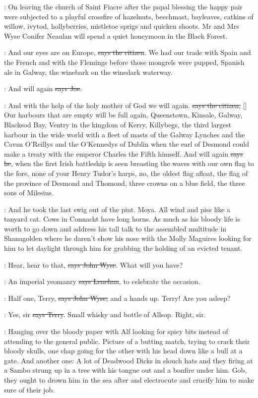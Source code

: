 :
On leaving the church of Saint Fiacre  after the papal
blessing the happy pair were subjected to a playful crossfire
of hazelnuts, beechmast, bayleaves, catkins of willow, ivytod,
hollyberries, mistletoe sprigs and quicken shoots. Mr and Mrs Wyse
Conifer Neaulan will spend a quiet honeymoon in the Black Forest.

\citizen:
And our eyes are on Europe, \sout{says the citizen}.
We had our trade with
Spain and the French and with the Flemings before those mongrels were
pupped, Spanish ale in Galway, the winebark on the winedark waterway.

\joe:
And will again \sout{says Joe}.

\citizen:
And with the help of the holy mother of God
we will again. \sout{says the
citizen,} []
Our harbours that are empty will be full
again, Queenstown, Kinsale, Galway, Blacksod Bay, Ventry in the kingdom of
Kerry, Killybegs, the third largest harbour in the wide world with a fleet
of masts of the Galway Lynches and the Cavan O'Reillys and the
O'Kennedys of Dublin when the earl of Desmond could make a treaty with
the emperor Charles the Fifth himself. And will again \sout{says he}, when the
first Irish battleship is seen breasting the waves with our own flag to
the fore, none of your Henry Tudor's harps, no, the oldest flag afloat,
the flag of the province of Desmond and Thomond, three crowns on a blue
field, the three sons of Milesius.

\Nq:
And he took the last swig out of the pint. Moya. All wind and piss like
a tanyard cat. Cows in Connacht have long horns. As much as his bloody
life is worth to go down and address his tall talk to the assembled
multitude in Shanagolden where he daren't show his nose with the Molly
Maguires looking for him to let daylight through him for grabbing the
holding of an evicted tenant.

\johnwyse:
Hear, hear to that, \sout{says John Wyse}.
What will you have?

\lenehan:
An imperial yeomanry \sout{says Lenehan},
to celebrate the occasion.

\johnwyse:
Half one, Terry, \sout{says John Wyse,}
and a hands up. Terry! Are you asleep?

\terry:
Yes, sir \sout{says Terry}.
Small whisky and bottle of Allsop. Right, sir.

\Nq:
Hanging over the bloody paper with Alf looking for spicy bits instead
of attending to the general public. Picture of a butting match, trying to
crack their bloody skulls, one chap going for the other with his head down
like a bull at a gate. And another one:
A lot of Deadwood Dicks in slouch hats and they firing at a Sambo strung
up in a tree with his tongue out and a bonfire under him. Gob, they ought
to drown him in the sea after and electrocute and crucify him to make sure
of their job.

